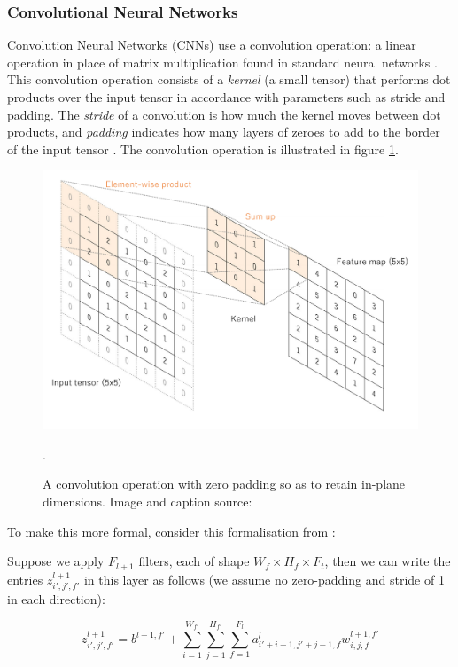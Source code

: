 \subsubsection{Convolutional Neural Networks}
Convolution Neural Networks (CNNs) use a convolution operation: a linear operation in place of matrix multiplication found in standard neural networks \cite{cnn}. This convolution operation consists of a \textit{kernel} (a small tensor) that performs dot products over the input tensor in accordance with parameters such as stride and padding. The \textit{stride} of a convolution is how much the kernel moves between dot products, and \textit{padding} indicates how many layers of zeroes to add to the border of the input tensor \cite{cnn}. The convolution operation is illustrated in figure \ref{fig:cnn}.

\begin{figure}
    \centering
    \includegraphics[scale = 0.25]{images/cnn.png}
    \caption{A convolution operation with zero padding so as to retain in-plane dimensions. Image and caption source: \cite{cnnfig}}.
    \label{fig:cnn}
\end{figure}

To make this more formal, consider this formalisation from \cite{csmlnotes}:

Suppose we apply $F_{l+1}$ filters, each of shape $W_f \times H_f \times F_t$, then we can write the entries $z_{i',j',f'}^{l+1}$ in this layer as follows (we assume no zero-padding and stride of 1 in each direction):



 \[z_{i',j',f'}^{l+1} = b^{l+1,f'} + \sum_{i=1}^{W_{f'}}\sum_{j=1}^{H_{f'}}\sum_{f=1}^{F_l}a^l_{i'+i-1,j'+j-1,f} w^{l+1,f'}_{i,j,f}
 \]
 
